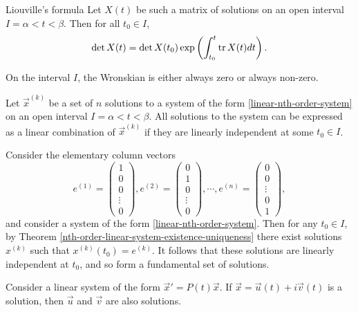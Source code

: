 \begin{thm}Liouville's formula\label{liouville-formula}\proofbreak
    Let $X(t)$ be such a matrix of solutions on an open interval $I = \alpha < t < \beta$. Then for all $t_0 \in I$,
    \[\det X(t) = \det X(t_0)\exp\left(\int_{t_0}^t \operatorname{tr} X(t)dt\right).\]
\end{thm}

\begin{cor}
    On the interval $I$, the Wronskian is either always zero or always non-zero.
\end{cor}

\begin{cor}
    Let $\vec{x}^{(k)}$ be a set of $n$ solutions to a system of the form \ref{linear-nth-order-system} on an open interval $I = \alpha < t < \beta$.
    All solutions to the system can be expressed as a linear combination of $\vec{x}^{(k)}$ if they are linearly independent at some $t_0 \in I$.
\end{cor}

\begin{rmk}
    Consider the elementary column vectors
    \[e^{(1)} = \begin{pmatrix}
        1 \\ 0 \\ 0 \\ \vdots \\ 0
    \end{pmatrix}, e^{(2)} = \begin{pmatrix}
        0 \\ 1 \\ 0 \\ \vdots \\ 0
    \end{pmatrix}, \cdots, e^{(n)} = \begin{pmatrix}
        0 \\ 0 \\ \vdots \\ 0 \\ 1
    \end{pmatrix},\]
    and consider a system of the form \ref{linear-nth-order-system}. Then for any $t_0 \in I$, by Theorem \ref{nth-order-linear-system-existence-uniqueness} there exist solutions $x^{(k)}$ such that $x^{(k)}(t_0) = e^{(k)}$. It follows that these solutions are linearly independent at $t_0$, and so form a fundamental set of solutions.
\end{rmk}

\begin{prop}
    Consider a linear system of the form $\vec{x}' = P(t)\vec{x}$. If $\vec{x} = \vec{u}(t) + i\vec{v}(t)$ is a solution, then $\vec{u}$ and $\vec{v}$ are also solutions.
\end{prop}

